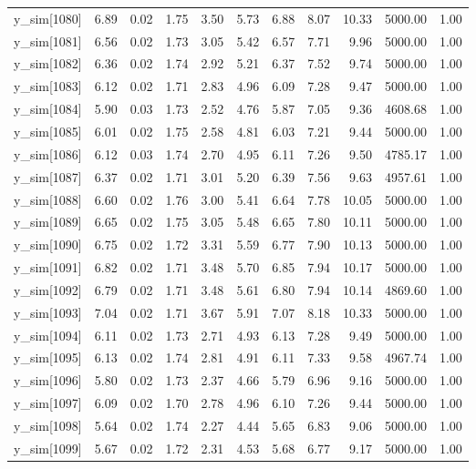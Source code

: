 \begin{table}[ht]
\begin{tabular}{rrrrrrrrrrr}
  y\_sim[1080] & 6.89 & 0.02 & 1.75 & 3.50 & 5.73 & 6.88 & 8.07 & 10.33 & 5000.00 & 1.00 \\ 
  y\_sim[1081] & 6.56 & 0.02 & 1.73 & 3.05 & 5.42 & 6.57 & 7.71 & 9.96 & 5000.00 & 1.00 \\ 
  y\_sim[1082] & 6.36 & 0.02 & 1.74 & 2.92 & 5.21 & 6.37 & 7.52 & 9.74 & 5000.00 & 1.00 \\ 
  y\_sim[1083] & 6.12 & 0.02 & 1.71 & 2.83 & 4.96 & 6.09 & 7.28 & 9.47 & 5000.00 & 1.00 \\ 
  y\_sim[1084] & 5.90 & 0.03 & 1.73 & 2.52 & 4.76 & 5.87 & 7.05 & 9.36 & 4608.68 & 1.00 \\ 
  y\_sim[1085] & 6.01 & 0.02 & 1.75 & 2.58 & 4.81 & 6.03 & 7.21 & 9.44 & 5000.00 & 1.00 \\ 
  y\_sim[1086] & 6.12 & 0.03 & 1.74 & 2.70 & 4.95 & 6.11 & 7.26 & 9.50 & 4785.17 & 1.00 \\ 
  y\_sim[1087] & 6.37 & 0.02 & 1.71 & 3.01 & 5.20 & 6.39 & 7.56 & 9.63 & 4957.61 & 1.00 \\ 
  y\_sim[1088] & 6.60 & 0.02 & 1.76 & 3.00 & 5.41 & 6.64 & 7.78 & 10.05 & 5000.00 & 1.00 \\ 
  y\_sim[1089] & 6.65 & 0.02 & 1.75 & 3.05 & 5.48 & 6.65 & 7.80 & 10.11 & 5000.00 & 1.00 \\ 
  y\_sim[1090] & 6.75 & 0.02 & 1.72 & 3.31 & 5.59 & 6.77 & 7.90 & 10.13 & 5000.00 & 1.00 \\ 
  y\_sim[1091] & 6.82 & 0.02 & 1.71 & 3.48 & 5.70 & 6.85 & 7.94 & 10.17 & 5000.00 & 1.00 \\ 
  y\_sim[1092] & 6.79 & 0.02 & 1.71 & 3.48 & 5.61 & 6.80 & 7.94 & 10.14 & 4869.60 & 1.00 \\ 
  y\_sim[1093] & 7.04 & 0.02 & 1.71 & 3.67 & 5.91 & 7.07 & 8.18 & 10.33 & 5000.00 & 1.00 \\ 
  y\_sim[1094] & 6.11 & 0.02 & 1.73 & 2.71 & 4.93 & 6.13 & 7.28 & 9.49 & 5000.00 & 1.00 \\ 
  y\_sim[1095] & 6.13 & 0.02 & 1.74 & 2.81 & 4.91 & 6.11 & 7.33 & 9.58 & 4967.74 & 1.00 \\ 
  y\_sim[1096] & 5.80 & 0.02 & 1.73 & 2.37 & 4.66 & 5.79 & 6.96 & 9.16 & 5000.00 & 1.00 \\ 
  y\_sim[1097] & 6.09 & 0.02 & 1.70 & 2.78 & 4.96 & 6.10 & 7.26 & 9.44 & 5000.00 & 1.00 \\ 
  y\_sim[1098] & 5.64 & 0.02 & 1.74 & 2.27 & 4.44 & 5.65 & 6.83 & 9.06 & 5000.00 & 1.00 \\ 
  y\_sim[1099] & 5.67 & 0.02 & 1.72 & 2.31 & 4.53 & 5.68 & 6.77 & 9.17 & 5000.00 & 1.00 \\ 

\end{tabular}
\end{table}

